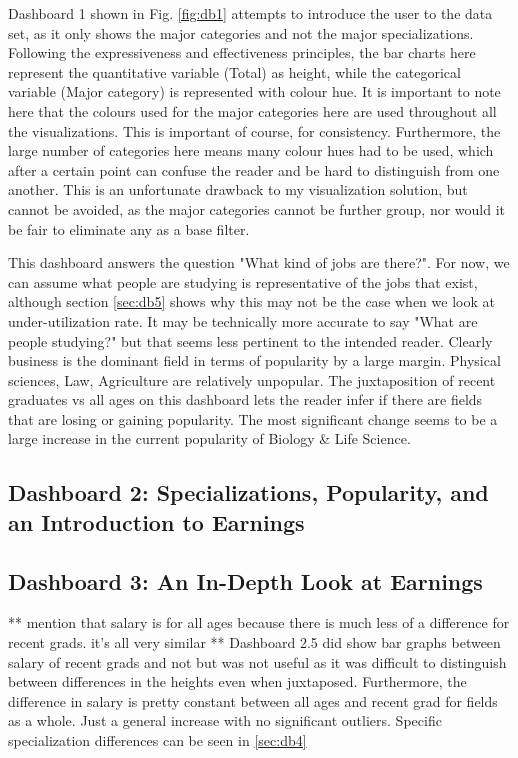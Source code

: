 \documentclass[sigchi]{acmart}
\begin{document}
Dashboard 1 shown in Fig. \ref{fig:db1} attempts to introduce the user to the data set, as it only shows the major categories and not the major specializations. Following the expressiveness and effectiveness principles, the bar charts here represent the quantitative variable (Total) as height, while the categorical variable (Major category) is represented with colour hue. It is important to note here that the colours used for the major categories here are used throughout all the visualizations. This is important of course, for consistency. Furthermore, the large number of categories here means many colour hues had to be used, which after a certain point can confuse the reader and be hard to distinguish from one another. This is an unfortunate drawback to my visualization solution, but cannot be avoided, as the major categories cannot be further group, nor would it be fair to eliminate any as a base filter. 

This dashboard answers the question "What kind of jobs are there?". For now, we can assume what people are studying is representative of the jobs that exist, although section \ref{sec:db5} shows why this may not be the case when we look at under-utilization rate. It may be technically more accurate to say "What are people studying?" but that seems less pertinent to the intended reader. Clearly business is the dominant field in terms of popularity by a large margin. Physical sciences, Law, Agriculture are relatively unpopular. The juxtaposition of recent graduates vs all ages on this dashboard lets the reader infer if there are fields that are losing or gaining popularity. The most significant change seems to be a large increase in the current popularity of Biology \& Life Science.

\subsection{Dashboard 2: Specializations, Popularity, and an Introduction to Earnings}
\label{sec:db2}

\subsection{Dashboard 3: An In-Depth Look at Earnings}
\label{sec:db3}

** mention that salary is for all ages because there is much less of a difference for recent grads. it's all very similar
** Dashboard 2.5 did show bar graphs between salary of recent grads and not but was not useful as it was difficult to distinguish between differences in the heights even when juxtaposed. Furthermore, the difference in salary is pretty constant between all ages and recent grad for fields as a whole. Just a general increase with no significant outliers. Specific specialization differences can be seen in \ref{sec:db4}
\end{document}
